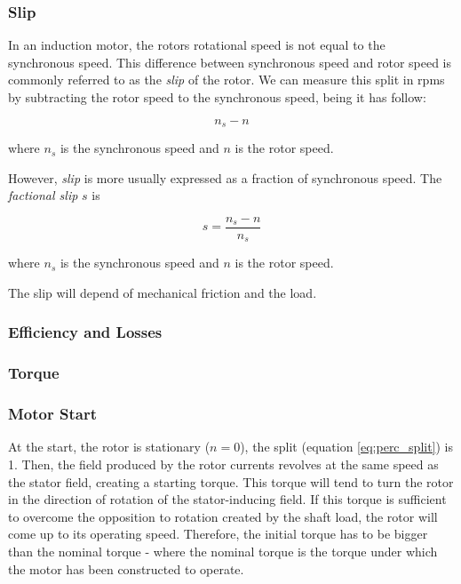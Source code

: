 \subsubsection{Slip}

In an induction motor, the rotors rotational speed is not equal to the synchronous speed. This difference between synchronous speed and rotor speed is commonly referred to as the \emph{slip} of the rotor. We can measure this split in rpms by subtracting the rotor speed to the synchronous speed, being it has follow:

\begin{equation} \label{eq:split}
	 n_{s} - n
\end{equation}

where $n_{s}$ is the synchronous speed and $n$ is the rotor speed.

However, \emph{slip} is more usually expressed as a fraction of synchronous speed. The \emph{factional slip} $s$ is

\begin{equation} \label{eq:perc_split}
	s = \frac{n_{s} - n}{n_{s}} 
\end{equation}

where $n_{s}$ is the synchronous speed and $n$ is the rotor speed.

The slip will depend of mechanical friction and the load.

\subsubsection{Efficiency and Losses}

\subsubsection{Torque}

\subsubsection{Motor Start}

At the start, the rotor is stationary ($n = 0$), the split (equation \ref{eq:perc_split}) is 1. Then, the field produced by the rotor currents revolves at the same speed as the stator field, creating a starting torque. 
This torque will tend to turn the rotor in the direction of rotation of the stator-inducing field. If this torque is sufficient to overcome the opposition to rotation created by the shaft load, the rotor will come up to its operating speed.
Therefore, the initial torque has to be bigger than the nominal torque - where the nominal torque is the torque under which the motor has been constructed to operate.

